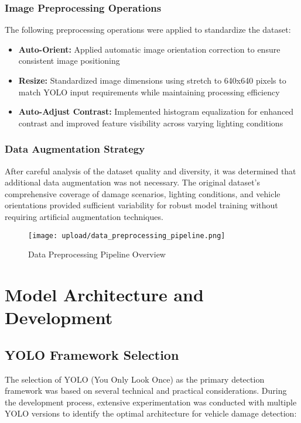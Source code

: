 \documentclass[12pt,a4paper]{report}
\begin{document}
\subsubsection{Image Preprocessing Operations}

The following preprocessing operations were applied to standardize the dataset:

\begin{itemize}
    \item \textbf{Auto-Orient:} Applied automatic image orientation correction to ensure consistent image positioning
    \item \textbf{Resize:} Standardized image dimensions using stretch to 640x640 pixels to match YOLO input requirements while maintaining processing efficiency
    \item \textbf{Auto-Adjust Contrast:} Implemented histogram equalization for enhanced contrast and improved feature visibility across varying lighting conditions
\end{itemize}

\subsubsection{Data Augmentation Strategy}

After careful analysis of the dataset quality and diversity, it was determined that additional data augmentation was not necessary. The original dataset's comprehensive coverage of damage scenarios, lighting conditions, and vehicle orientations provided sufficient variability for robust model training without requiring artificial augmentation techniques.

\begin{figure}[H]
    \centering
    \texttt{[image: upload/data\_preprocessing\_pipeline.png]}
    \caption{Data Preprocessing Pipeline Overview}
    \label{fig:preprocessing_pipeline}
\end{figure}

\section{Model Architecture and Development}

\subsection{YOLO Framework Selection}

The selection of YOLO (You Only Look Once) as the primary detection framework was based on several technical and practical considerations. During the development process, extensive experimentation was conducted with multiple YOLO versions to identify the optimal architecture for vehicle damage detection:
\end{document}
